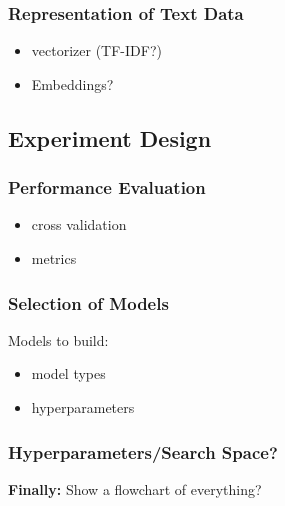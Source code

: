 \subsubsection{Representation of Text Data}
\begin{itemize}[noitemsep]
	\item vectorizer (TF-IDF?)
	\item Embeddings?
\end{itemize}






\subsection{Experiment Design}


\subsubsection{Performance Evaluation}
\begin{itemize}[noitemsep]
	\item cross validation
	\item metrics
\end{itemize}





\subsubsection{Selection of Models}


Models to build:





\begin{itemize}[noitemsep]
	\item model types
	\item hyperparameters
\end{itemize}

\subsubsection{Hyperparameters/Search Space?}


\textbf{Finally:} Show a flowchart of everything?






